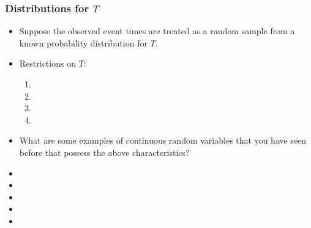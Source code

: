 \begin{frame}
\frametitle{Distributions for $T$}
\begin{itemize}
\item Suppose the observed event times are treated as a random sample from a known probability distribution for $T$.
\item Restrictions on $T$:
\begin{enumerate}
\item %
\item[]
\item %
\item[] %
\end{enumerate}
\item What are some examples of continuous random variables that you have seen before that possess the above characteristics?
\item[] %
\item[] %
\item[] %
\item[]
\item[]
\end{itemize}
\end{frame}

